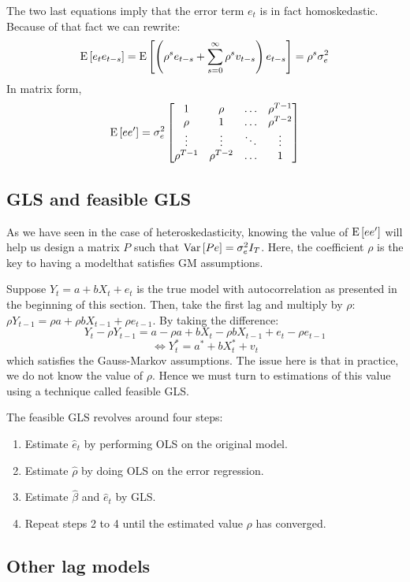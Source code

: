 The two last equations imply that the error term $e_t$ is in fact homoskedastic. Because of that fact we can rewrite: $$\operatorname{E}\left[e_te_{t-s}\right] = \operatorname{E}\left[\left(\rho^s e_{t-s} + \sum_{s=0}^{\infty} \rho^s v_{t-s}\right)e_{t-s}\right] = \rho^s \sigma_e^2 $$ In matrix form, \begin{align*}
\operatorname{E}\left[ee'\right] = \sigma_e^2 \begin{bmatrix}
1 & \rho & \hdots & \rho^{T-1} \\
\rho & 1 & \hdots & \rho^{T-2} \\
\vdots & \vdots	& \ddots & \vdots\\
\rho^{T-1} & \rho^{T-2} & \hdots & 1
\end{bmatrix}
\end{align*}

\subsection{GLS and feasible GLS}

As we have seen in the case of heteroskedasticity, knowing the value of $\operatorname{E}\left[ee'\right]$ will help us design a matrix $P$ such that $\operatorname{Var}\left[Pe\right] = \sigma_e^2 I_T$. Here, the coefficient $\rho$ is the key to having a modelthat satisfies GM assumptions.

Suppose $Y_t = a + bX_t + e_t$ is the true model with autocorrelation as presented in the beginning of this section. Then, take the first lag and multiply by $\rho$: $\rho Y_{t-1} = \rho a + \rho b X_{t-1} + \rho e_{t-1}$. By taking the difference: $$Y_t - \rho Y_{t-1} = a - \rho a + bX_t - \rho b X_{t-1} + e_t - \rho e_{t-1} $$ $$\Leftrightarrow Y_t^* = a^* + b X_t^* + v_t $$ which satisfies the Gauss-Markov assumptions. The issue here is that in practice, we do not know the value of $\rho$. Hence we must turn to estimations of this value using a technique called feasible GLS.

The feasible GLS revolves around four steps:\begin{enumerate}
\item Estimate $\hat e_t$ by performing OLS on the original model.
\item Estimate $\hat\rho$ by doing OLS on the error regression.
\item Estimate $\hat\beta$ and $\hat e_t$ by GLS.
\item Repeat steps 2 to 4 until the estimated value $\rho$ has converged.
\end{enumerate}

\subsection{Other lag models}

